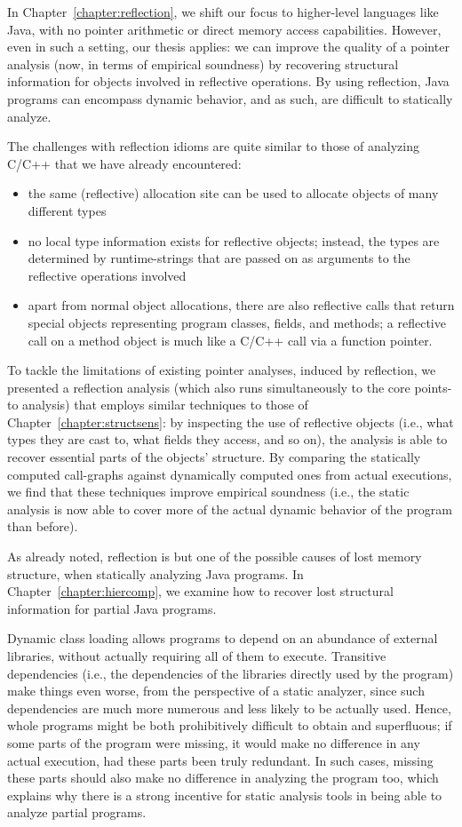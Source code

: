 In Chapter~\ref{chapter:reflection}, we shift our focus to
higher-level languages like Java, with no pointer arithmetic or direct
memory access capabilities. However, even in such a setting, our thesis
applies: we can improve the quality of a pointer analysis (now, in
terms of empirical soundness) by recovering structural information for
objects involved in reflective operations. By using reflection, Java
programs can encompass dynamic behavior, and as such, are difficult to
statically analyze.

The challenges with reflection idioms are quite similar to those of
analyzing C/C++ that we have already encountered:
\begin{itemize}[\(\cdot\)]
\item the same (reflective) allocation site can be used to allocate
  objects of many different types
\item no local type information exists for reflective objects;
  instead, the types are determined by runtime-strings that are passed
  on as arguments to the reflective operations involved
\item apart from normal object allocations, there are also reflective
  calls that return special objects representing program classes,
  fields, and methods; a reflective call on a method object is much
  like a C/C++ call via a function pointer.
\end{itemize}

To tackle the limitations of existing pointer analyses, induced by
reflection, we presented a reflection analysis (which also runs
simultaneously to the core points-to analysis) that employs similar
techniques to those of Chapter~\ref{chapter:structsens}: by inspecting
the use of reflective objects (i.e., what types they are cast to, what
fields they access, and so on), the analysis is able to recover
essential parts of the objects' structure.
%
By comparing the statically computed call-graphs against dynamically
computed ones from actual executions, we find that these techniques
improve empirical soundness (i.e., the static analysis is now able to
cover more of the actual dynamic behavior of the program than
before).

As already noted, reflection is but one of the possible causes of lost
memory structure, when statically analyzing Java programs. In
Chapter~\ref{chapter:hiercomp}, we examine how to recover lost
structural information for partial Java programs.

Dynamic class loading allows programs to depend on an abundance of
external libraries, without actually requiring all of them to
execute. Transitive dependencies (i.e., the dependencies of the
libraries directly used by the program) make things even worse, from
the perspective of a static analyzer, since such dependencies are much
more numerous and less likely to be actually used. Hence, whole
programs might be both prohibitively difficult to obtain and
superfluous; if some parts of the program were missing, it would make
no difference in any actual execution, had these parts been truly
redundant. In such cases, missing these parts should also make no
difference in analyzing the program too, which explains why there is a
strong incentive for static analysis tools in being able to analyze
partial programs.

